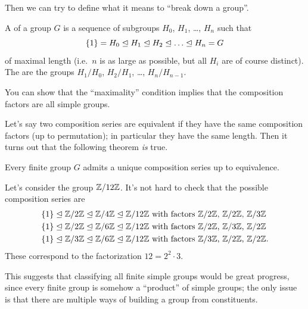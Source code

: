 Then we can try to define what it means to ``break down a group''.
\begin{definition}
	A  of a group $G$ is a sequence of subgroups
	$H_0$, $H_1$, \dots, $H_n$ such that
	\[ \{1\} = H_0 \normalin H_1 \normalin H_2 \normalin \dots
		\normalin H_n = G \]
	of maximal length (i.e.\ $n$ is as large as possible,
	but all $H_i$ are of course distinct).
	The  are the groups
	$H_1/H_0$, $H_2/H_1$, \dots, $H_n/H_{n-1}$.
\end{definition}
You can show that the ``maximality'' condition implies that the composition factors are all simple groups.

Let's say two composition series are equivalent if they have the same composition factors (up to permutation); in particular they have the same length.
Then it turns out that the following theorem \emph{is} true.
\begin{theorem}
	Every finite group $G$ admits a unique composition series up to equivalence.
\end{theorem}

\begin{example}
	[Fundamental theorem of arithmetic when $n=12$]
	Let's consider the group $\mathbb Z/12\mathbb Z$.
	It's not hard to check that the possible composition series are
	\begin{align*}
		\{1\} \trianglelefteq \mathbb Z/2\mathbb Z \trianglelefteq \mathbb Z/4\mathbb Z \trianglelefteq \mathbb Z/12\mathbb Z
		& \text{ with factors $\mathbb Z/2\mathbb Z$, $\mathbb Z/2\mathbb Z$, $\mathbb Z/3\mathbb Z$} \\
		\{1\} \trianglelefteq \mathbb Z/2\mathbb Z \trianglelefteq \mathbb Z/6\mathbb Z \trianglelefteq \mathbb Z/12\mathbb Z
		& \text{ with factors $\mathbb Z/2\mathbb Z$, $\mathbb Z/3\mathbb Z$, $\mathbb Z/2\mathbb Z$} \\
		\{1\} \trianglelefteq \mathbb Z/3\mathbb Z \trianglelefteq \mathbb Z/6\mathbb Z \trianglelefteq \mathbb Z/12\mathbb Z
		& \text{ with factors $\mathbb Z/3\mathbb Z$, $\mathbb Z/2\mathbb Z$, $\mathbb Z/2\mathbb Z$}.
	\end{align*}
	These correspond to the factorization $12 = 2^2 \cdot 3$.
\end{example}

This suggests that classifying all finite simple groups would be great progress, since every finite group is somehow a ``product'' of simple groups;
the only issue is that there are multiple ways of building a group from constituents.

